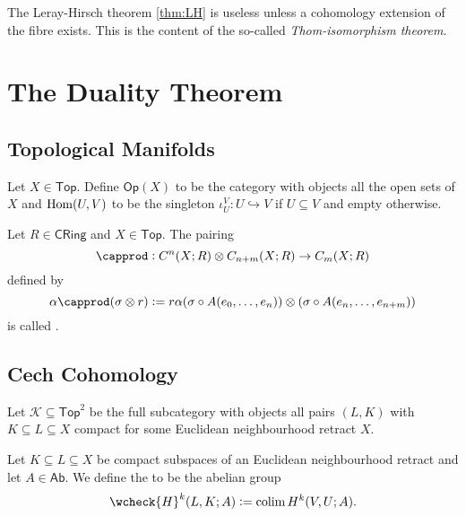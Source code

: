 The Leray-Hirsch theorem \ref{thm:LH} is useless unless a cohomology extension of the fibre exists. This is the content of the so-called \emph{Thom-isomorphism theorem}.

\begin{theorem}
	\label{thm:TIT}
	
\end{theorem}

\section*{The Duality Theorem}
\subsection*{Topological Manifolds}

\begin{definition}[$\mathsf{Op}(X)$]
	Let $X \in \mathsf{Top}$. Define $\mathsf{Op}(X)$ to be the category with objects all the open sets of $X$ and $\operatorname{Hom}(U,V)$ to be the singleton $\iota_U^V : U \hookrightarrow V$ if $U \subseteq V$ and empty otherwise.
\end{definition}

\begin{definition}
	Let $R \in \mathsf{CRing}$ and $X \in \mathsf{Top}$. The pairing
	\begin{equation*}
		\capprod : C^n(X;R) \otimes C_{n + m}(X;R) \to C_m(X;R)
	\end{equation*}
	\noindent defined by
	\begin{equation*}
		\alpha \capprod (\sigma \otimes r) := r\alpha(\sigma \circ A(e_0,\dots,e_n)) \otimes (\sigma \circ A(e_n,\dots,e_{n + m}))
	\end{equation*}
	\noindent is called .
\end{definition}

\subsection*{Cech Cohomology}

\begin{definition}
	Let $\mathcal{K} \subseteq \mathsf{Top}^2$ be the full subcategory with objects all pairs $(L,K)$ with $K \subseteq L \subseteq X$ compact for some Euclidean neighbourhood retract $X$.
\end{definition}

\begin{definition}
	Let $K \subseteq L \subseteq X$ be compact subspaces of an Euclidean neighbourhood retract and let $A \in \mathsf{Ab}$. We define the  to be the abelian group
	\begin{equation*}
		\wcheck{H}^k(L,K;A) := \colim H^k(V,U;A). 
	\end{equation*}
\end{definition}

